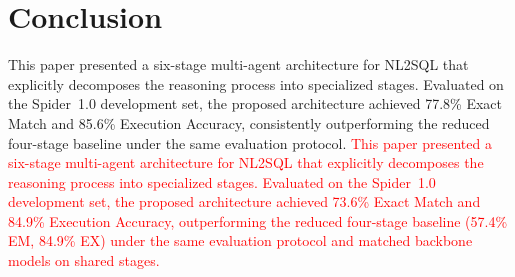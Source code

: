 \documentclass{svproc}
\begin{document}


\section{Conclusion}
\label{sec:conclusion}

This paper presented a six-stage multi-agent architecture for NL2SQL that explicitly decomposes the reasoning process into specialized stages. Evaluated on the Spider~1.0 development set, the proposed architecture achieved 77.8\% Exact Match and 85.6\% Execution Accuracy, consistently outperforming the reduced four-stage baseline under the same evaluation protocol.
\textcolor{red}{This paper presented a six-stage multi-agent architecture for NL2SQL that explicitly decomposes the reasoning process into specialized stages. Evaluated on the Spider~1.0 development set, the proposed architecture achieved 73.6\% Exact Match and 84.9\% Execution Accuracy, outperforming the reduced four-stage baseline (57.4\% EM, 84.9\% EX) under the same evaluation protocol and matched backbone models on shared stages.}
\end{document}
